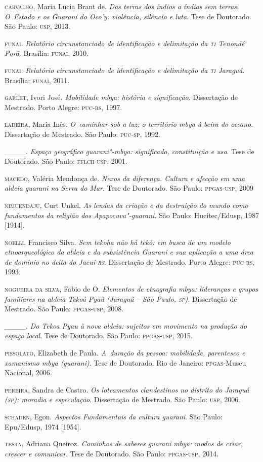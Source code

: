 \begin{Parskip}
\textsc{carvalho}, Maria Lucia Brant de. \emph{Das terras dos índios a índios sem
terras. O~Estado e os Guarani do Oco’y: violência, silêncio e luta}.
Tese de Doutorado. São Paulo: \textsc{usp}, 2013.

\textsc{funai}. \emph{Relatório circunstanciado de identificação e delimitação da \textsc{ti}
Tenondé Porã}. Brasília: \textsc{funai}, 2010.

\textsc{funai}. \emph{Relatório circunstanciado de identificação e delimitação da \textsc{ti}
Jaraguá}. Brasília: \textsc{funai}, 2011.

\textsc{garlet}, Ivori José. \emph{Mobilidade mbya: história e significação}.
Dissertação de Mestrado. Porto Alegre: \textsc{puc}-\textsc{rs}, 1997.

\textsc{ladeira}, Maria Inês. \emph{O~caminhar sob a luz: o território mbya à beira do
oceano}. Dissertação de Mestrado. São Paulo: \textsc{puc}-\textsc{sp}, 1992. 

\_\_\_\_. \emph{Espaço geográfico guarani"-mbya: significado, constituição e
uso}. Tese de Doutorado. São Paulo: \textsc{fflch}-\textsc{usp}, 2001.

\textsc{macedo}, Valéria Mendonça de. \emph{Nexos da diferença. Cultura e afecção em
uma aldeia guarani na Serra do Mar}. Tese de Doutorado. São Paulo:
\textsc{ppgas}-\textsc{usp}, 2009

\textsc{nimuendaju}, Curt Unkel. \emph{As lendas da criação e da destruição do mundo
como fundamentos da religião dos Apapocuva"-guarani}. São Paulo:
Hucitec/Edusp, 1987 [1914].

\textsc{noelli}, Francisco Silva. \emph{Sem tekoha não há tekó: em busca de um modelo
etnoarqueológico da aldeia e da subsistência Guarani e sua aplicação a
uma área de domínio no delta do Jacuí-\textsc{rs}}. Dissertação de Mestrado.
Porto Alegre: \textsc{puc}-\textsc{rs}, 1993.

\textsc{nogueira} \textsc{da} \textsc{silva}, Fabio de O. \emph{Elementos de etnografia mbya: lideranças
e grupos familiares na aldeia Tekoá Pyaú (Jaraguá -- São Paulo, \textsc{sp})}.
Dissertação de Mestrado. São Paulo: \textsc{ppgas}-\textsc{usp}, 2008.

\_\_\_\_. \emph{Do Tekoa Pyau à nova aldeia: sujeitos em movimento na produção do
espaço local}. Tese de Doutorado. São Paulo: \textsc{ppgas}-\textsc{usp}, 2015.

\textsc{pissolato}, Elizabeth de Paula. \emph{A~duração da pessoa: mobilidade,
parentesco e xamanismo mbya (guarani)}. Tese de Doutorado. Rio de
Janeiro: \textsc{ppgas}-Museu Nacional, 2006. 

\textsc{pereira}, Sandra de Castro. \emph{Os loteamentos clandestinos no distrito do
Jaraguá (\textsc{sp}): moradia e especulação}. Dissertação de Mestrado. São
Paulo: \textsc{usp}, 2006.

\textsc{schaden}, Egon. \emph{Aspectos Fundamentais da cultura guarani}. São Paulo:
Epu/Edusp, 1974 [1954].

\textsc{testa}, Adriana Queiroz. \emph{Caminhos de saberes guarani mbya: modos de
criar, crescer e comunicar}. Tese de Doutorado. São Paulo: \textsc{ppgas}-\textsc{usp},
2014.
\end{Parskip}

